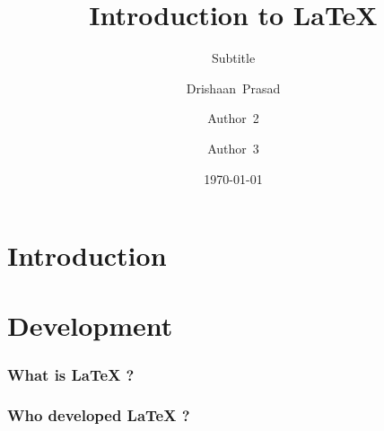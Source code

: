 \documentclass{beamer}
\begin{document}
    \begin{frame}
        \title{Introduction to \LaTeX{}}
        \author{Drishaan~Prasad \and 
        Author~2 \and
        Author~3}
        \date{\today}
        \subtitle{Subtitle}
        \maketitle
    \end{frame}
    \section{Introduction}
    \section{Development}
    \begin{frame}
        \tableofcontents
    \end{frame}
    \begin{frame}
        \frametitle{What is LaTeX ?}
        \blindtext
    \end{frame}
    \begin{frame}
        \frametitle{Who developed LaTeX ?}
        \blindtext
    \end{frame}
\end{document}
